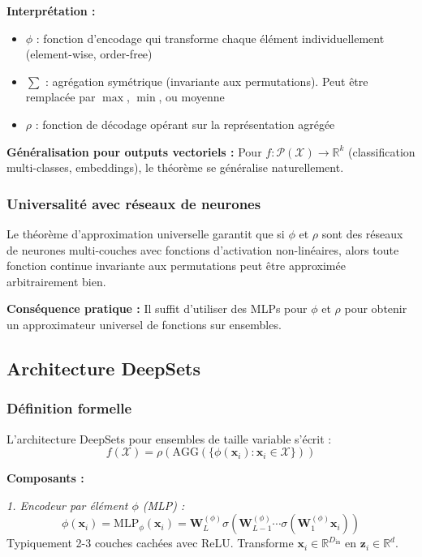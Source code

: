 \textbf{Interprétation :}
\begin{itemize}
    \item $\phi$ : fonction d'encodage qui transforme chaque élément individuellement (element-wise, order-free)
    \item $\sum$ : agrégation symétrique (invariante aux permutations). Peut être remplacée par $\max$, $\min$, ou moyenne
    \item $\rho$ : fonction de décodage opérant sur la représentation agrégée
\end{itemize}

\textbf{Généralisation pour outputs vectoriels :}
Pour $f: \mathcal{P}(\mathcal{X}) \to \mathbb{R}^k$ (classification multi-classes, embeddings), le théorème se généralise naturellement.

\subsubsection{Universalité avec réseaux de neurones}

Le théorème d'approximation universelle garantit que si $\phi$ et $\rho$ sont des réseaux de neurones multi-couches avec fonctions d'activation non-linéaires, alors toute fonction continue invariante aux permutations peut être approximée arbitrairement bien.

\textbf{Conséquence pratique :}
Il suffit d'utiliser des MLPs pour $\phi$ et $\rho$ pour obtenir un approximateur universel de fonctions sur ensembles.

\subsection{Architecture DeepSets}

\subsubsection{Définition formelle}

L'architecture DeepSets pour ensembles de taille variable s'écrit :
\[
f(\mathcal{X}) = \rho\left(\text{AGG}\left(\{\phi(\mathbf{x}_i) : \mathbf{x}_i \in \mathcal{X}\}\right)\right)
\]

\textbf{Composants :}

\textit{1. Encodeur par élément $\phi$ (MLP) :}
\[
\phi(\mathbf{x}_i) = \text{MLP}_\phi(\mathbf{x}_i) = \mathbf{W}_L^{(\phi)} \sigma(\mathbf{W}_{L-1}^{(\phi)} \cdots \sigma(\mathbf{W}_1^{(\phi)} \mathbf{x}_i))
\]
Typiquement 2-3 couches cachées avec ReLU. Transforme $\mathbf{x}_i \in \mathbb{R}^{D_{\text{in}}}$ en $\mathbf{z}_i \in \mathbb{R}^{d}$.

